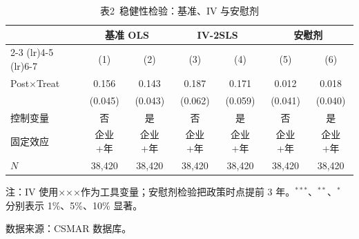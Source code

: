 \documentclass[11pt]{article}
\begin{document}
\begin{table}[!htbp]
  \centering
  \caption{表2\ 稳健性检验：基准、IV 与安慰剂}
  \label{tab:robust}
  \begin{threeparttable}
  \begin{tabular}{lcccccc}
    \toprule
                       & \multicolumn{2}{c}{基准 OLS}
                       & \multicolumn{2}{c}{IV-2SLS}
                       & \multicolumn{2}{c}{安慰剂}                 \\
    \cmidrule(lr){2-3} \cmidrule(lr){4-5} \cmidrule(lr){6-7}
                       & (1)        & (2)        & (3)        & (4)        & (5)       & (6)        \\
    \midrule
    Post$\times$Treat  & 0.156\sym{***} & 0.143\sym{***} & 0.187\sym{***} & 0.171\sym{***} & 0.012     & 0.018      \\
                       & (0.045)    & (0.043)    & (0.062)    & (0.059)    & (0.041)   & (0.040)    \\
    \midrule
    控制变量           & 否         & 是         & 否         & 是         & 否        & 是         \\
    固定效应           & 企业+年    & 企业+年    & 企业+年    & 企业+年    & 企业+年   & 企业+年    \\
    $N$                & 38{,}420   & 38{,}420   & 38{,}420   & 38{,}420   & 38{,}420  & 38{,}420   \\
    \bottomrule
  \end{tabular}
  \begin{tablenotes}\footnotesize
    \item 注：IV 使用×××作为工具变量；安慰剂检验把政策时点提前 3 年。$^{***}$、$^{**}$、$^{*}$ 分别表示 1\%、5\%、10\% 显著。
    \item 数据来源：CSMAR 数据库。
  \end{tablenotes}
  \end{threeparttable}
\end{table}
\end{document}
